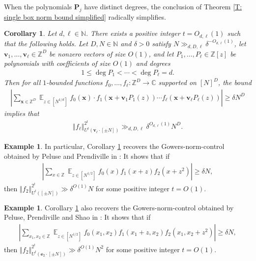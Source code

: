 \documentclass[11pt]{amsart}
\newtheorem{corollary}[lemma]{Corollary}
\theoremstyle{definition}
\newtheorem{example}[lemma]{Example} %
\DeclareMathOperator*{\E}{\mathbb{E}}
\newcommand{\C}{{\mathbb C}}
\newcommand{\N}{{\mathbb N}}
\newcommand{\Z}{{\mathbb Z}}
\newcommand{\be}{{\mathbf{e}}}
\newcommand{\p}{{\textbf{P}}}
\newcommand{\bv}{{\textbf{v}}}
\newcommand{\bx}{{\textbf{x}}}
\newcommand{\norm}[1]{\left\Vert #1\right\Vert}
\newcommand{\abs}[1]{\mathopen{}\left| #1\mathclose{}\right|}
\begin{document}
When the polynomials $\p_j$ have distinct degrees, the conclusion of Theorem \ref{T: single box norm bound simplified} radically simplifies.
\begin{corollary}\label{C: distinct degrees}
    Let $d, \ell \in \N$.  There exists a positive integer $t=O_{d, \ell}(1)$ such that the following holds.  Let $D, N\in\N$ and $\delta>0$ satisfy $N\gg_{d,D,\ell}\delta^{-O_{d,\ell}(1)}$, let $\bv_1, \ldots, \bv_\ell\in\Z^{{D}}$ be nonzero vectors of size $O(1)$,  and let $P_1, \ldots, P_\ell\in\Z[z]$ be polynomials with coefficients of size $O(1)$ and degrees
    \begin{align*}
        1\leq \deg P_1 < \cdots < \deg P_\ell =d.
    \end{align*}
     Then for all $1$-bounded functions $f_0, \ldots, f_\ell:\Z^D\to\C$ supported on $[N]^D$, the bound
    \begin{align*}
            \abs{\sum_{\bx\in\Z^D}\E_{z\in[N^{1/d}]}
            f_0(\bx)\cdot f_1(\bx+\bv_1 P_1(z))\cdots f_\ell(\bx+\bv_\ell P_\ell(z))} \geq \delta N^D
    \end{align*}
    implies that
    \begin{align*}
        \norm{f_\ell}_{U^t(\bv_\ell\cdot[\pm N])}^{2^{t}}\gg_{d, D, \ell}\delta^{O_{d, \ell}(1)}N^{D}.
    \end{align*}
\end{corollary}
\begin{example}
    In particular, Corollary \ref{C: distinct degrees} recovers the Gowers-norm-control obtained by Peluse and Prendiville in \cite{PP19}: It shows that if
    \begin{align*}
        \abs{\sum_{x\in\Z}\E_{z\in[N^{1/2}]}f_0(x)f_1(x+z)f_2(x+z^2)} \geq \delta N,
    \end{align*}
    then $\norm{f_2}_{U^t([\pm N])}^{2^t}\gg \delta^{O(1)}N$ for some positive integer $t=O(1)$.
\end{example}
\begin{example}
    Corollary \ref{C: distinct degrees} also recovers the Gowers-norm-control obtained by Peluse, Prendiville and Shao in \cite{PPS24}: It shows that if
    \begin{align*}
        \abs{\sum_{x_1,x_2\in\Z}\E_{z\in[N^{1/2}]}f_0(x_1,x_2)f_1(x_1+z,x_2)f_2(x_1, x_2+z^2)} \geq \delta N,
    \end{align*}
    then $\norm{f_2}_{U^t(\be_2 \cdot [\pm N])}^{2^t}\gg \delta^{O(1)}N^2$ for some positive integer $t=O(1)$.
\end{example}
\end{document}
